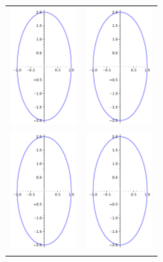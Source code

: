 \documentclass[
]{article}
\begin{document}
\begin{longtable}[]{@{}ll@{}}
\toprule
\endhead
\includegraphics[width=1in,height=\textheight]{e.pdf} &
\includegraphics[width=1in,height=\textheight]{e.pdf}\tabularnewline
\includegraphics[width=1in,height=\textheight]{e.pdf} &
\includegraphics[width=1in,height=\textheight]{e.pdf}\tabularnewline
\bottomrule
\end{longtable}
\end{document}
